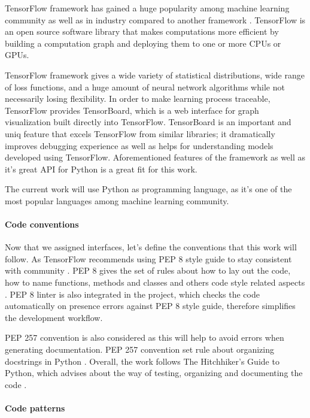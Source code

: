 TensorFlow framework has gained a huge popularity among machine learning
community as well as in industry compared to another framework \cite{DBLP:journals/corr/Goldsborough16}.
TensorFlow is an open source software library that makes computations more
efficient by building a computation graph and deploying them to one or more
CPUs or GPUs.


TensorFlow framework gives a wide variety of statistical distributions, wide
range of loss functions, and a huge amount of neural network algorithms while
not necessarily losing  flexibility. In order to make learning process traceable,
TensorFlow provides TensorBoard, which is a web interface for graph visualization
built directly into TensorFlow.
TensorBoard is an important and uniq feature that excels TensorFlow from similar
libraries; it dramatically improves debugging experience as well as helps
for understanding models developed using TensorFlow.
Aforementioned features of the framework as well
as it's great API for Python is a great fit for this work.

The current work will use Python as programming language, as it's one of
the most popular languages among machine learning community.


\paragraph{Code conventions}
Now that we assigned interfaces, let's define the conventions that this work
will follow. As TensorFlow recommends using PEP 8 style guide to stay consistent
with community \cite{TfWeb}. PEP 8 gives the set of rules about how to lay out
the code, how to name functions, methods and classes and others code style related
aspects \cite{Rossum}. PEP 8 linter is also integrated in the project, which checks the code
automatically on presence errors against PEP 8 style guide,
therefore simplifies the development workflow.

PEP 257 convention is also considered as this will help to avoid errors when
generating documentation. PEP 257 convention set rule about organizing
docstrings in Python \cite{Goodger2001}.
Overall, the work follows The Hitchhiker's Guide to Python, which advises
about the way of testing, organizing and documenting the code \cite{Reitz}.

\paragraph{Code patterns}

